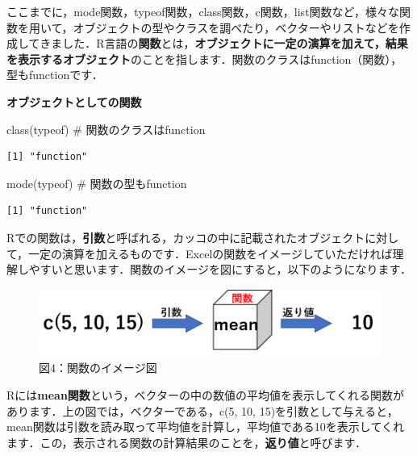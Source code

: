 \documentclass[
  letterpaper,
  DIV=11,
  numbers=noendperiod]{scrreprt}
\newenvironment{Shaded}{\begin{snugshade}}{\end{snugshade}}
\newcommand{\CommentTok}[1]{\textcolor[rgb]{0.37,0.37,0.37}{#1}}
\newcommand{\FunctionTok}[1]{\textcolor[rgb]{0.28,0.35,0.67}{#1}}
\newcommand{\NormalTok}[1]{\textcolor[rgb]{0.00,0.23,0.31}{#1}}
\begin{document}
ここまでに，mode関数，typeof関数，class関数，c関数，list関数など，様々な関数を用いて，オブジェクトの型やクラスを調べたり，ベクターやリストなどを作成してきました．R言語の\textbf{関数}とは，\textbf{オブジェクトに一定の演算を加えて，結果を表示するオブジェクト}のことを指します．関数のクラスはfunction（関数），型もfunctionです．

\textbf{オブジェクトとしての関数}

\begin{Shaded}
\begin{Highlighting}[]
\FunctionTok{class}\NormalTok{(typeof) }\CommentTok{\# 関数のクラスはfunction}
\end{Highlighting}
\end{Shaded}

\begin{verbatim}
[1] "function"
\end{verbatim}

\begin{Shaded}
\begin{Highlighting}[]
\FunctionTok{mode}\NormalTok{(typeof) }\CommentTok{\# 関数の型もfunction}
\end{Highlighting}
\end{Shaded}

\begin{verbatim}
[1] "function"
\end{verbatim}

Rでの関数は，\textbf{引数}と呼ばれる，カッコの中に記載されたオブジェクトに対して，一定の演算を加えるものです．Excelの関数をイメージしていただければ理解しやすいと思います．関数のイメージを図にすると，以下のようになります．

\begin{figure}

{\centering \includegraphics{././image/function_image.png}

}

\caption{図4：関数のイメージ図}

\end{figure}

Rには\textbf{mean関数}という，ベクターの中の数値の平均値を表示してくれる関数があります．上の図では，ベクターである，c(5,
10,
15)を引数として与えると，mean関数は引数を読み取って平均値を計算し，平均値である10を表示してくれます．この，表示される関数の計算結果のことを，\textbf{返り値}と呼びます．
\end{document}
